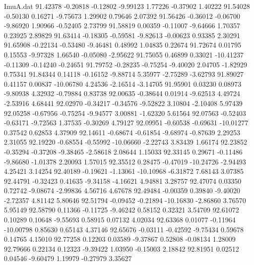 \begin{filecontents}{ImuA.dat}
  91.42378   -0.20818   -0.12802   -9.99123    1.77226   -0.37902    1.40222
  91.54028   -0.50130    0.16271   -9.75673    1.29902    0.79646    2.07392
  91.56426   -0.36012   -0.06700   -9.86920    1.90966   -0.52405    2.73799
  91.58819    0.00359   -0.11007   -9.64666    1.70357    0.23925    2.89829
  91.63414   -0.18305   -0.59581   -9.82613   -0.00623    0.93385    2.30291
  91.65908   -0.22134   -0.53480   -9.46481    0.48992    1.04835    0.22674
  91.72674    0.01795    0.15553   -9.97328    1.66540   -0.05080   -2.95622
  91.75055    0.46899    0.33021  -10.41237   -0.11309   -0.14240   -0.24651
  91.79752   -0.28235   -0.75254   -9.40020    2.04705   -1.82929    0.75341
  91.84344    0.14118   -0.16152   -9.88714    5.35977   -2.75289   -3.62793
  91.89027    0.41157    0.00837  -10.06780    4.24536   -2.16514   -3.14705
  91.95901    0.03230    0.08973   -9.80938    4.32932   -0.79884    0.83738
  92.00635   -0.38644    0.01914   -9.62513    4.49724   -2.53916    4.68441
  92.02970   -0.34217   -0.34576   -9.52822    3.10804   -2.10408    5.97439
  92.05258   -0.67956   -0.75254   -9.94577    3.00881   -1.62320    5.61564
  92.07563   -0.52403   -0.63171   -9.72563    1.37535   -0.30269    4.79127
  92.09951   -0.60538   -0.69631  -10.01277    0.37542    0.62853    4.37909
  92.14611   -0.68674   -0.61854   -9.68974   -0.87639    2.29253    2.31055
  92.19220   -0.68554   -0.55992  -10.06660   -2.22743    3.83439    1.66174
  92.23852   -0.35294   -0.37208   -9.38465   -2.58618    2.08644    1.15033
  92.33145    0.29671   -0.11486   -9.86680   -1.01378    2.20093    1.57015
  92.35512    0.28475   -0.47019  -10.24726   -2.94493    4.25421    3.14254
  92.40189   -0.19621   -1.13061  -10.10968   -6.31872    7.68143    3.07385
  92.44791   -0.32423    0.41635   -9.34158   -4.16621    4.94881    3.28757
  92.47074    0.03350    0.72742   -9.08674   -2.99836    4.56716    4.67678
  92.49484   -0.00359    0.39840   -9.40020   -2.72357    4.81142    5.80646
  92.51794   -0.09452   -0.21894  -10.16830   -2.86860    3.76570    5.95149
  92.58790    0.11366   -0.11725   -9.46242    0.58152    0.32321    3.54709
  92.61072    0.10289    0.10648   -9.55693    0.58915    0.07132    4.02034
  92.63368    0.01077   -0.11964  -10.00798    0.85630    0.65143    4.37146
  92.65676   -0.03111   -0.42592   -9.75434    0.59678    0.14765    4.15010
  92.77258    0.12203    0.03589   -9.37867    0.52808   -0.08134    1.28009
  92.79666    0.22134    0.12323   -9.39422    1.03950   -0.15003    2.18842
  92.81951    0.02512    0.04546   -9.60479    1.19979   -0.27979    3.35627

\end{filecontents}
